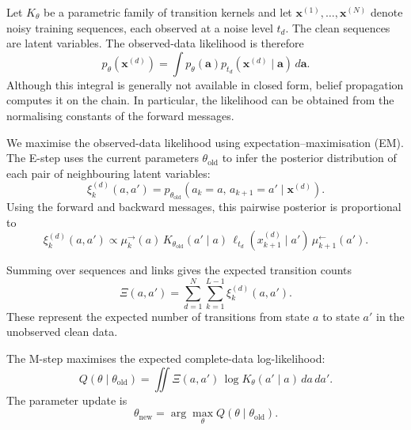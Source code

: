 Let $K_\theta$ be a parametric family of transition kernels
and let $\mathbf{x}^{(1)},\ldots,\mathbf{x}^{(N)}$ denote
noisy training sequences, each observed at a noise level
$t_d$. The clean sequences are latent variables. The
observed-data likelihood is therefore
\begin{equation}
    p_\theta(\mathbf{x}^{(d)})
    =
    \int
    p_\theta(\mathbf{a})
    p_{t_d}(\mathbf{x}^{(d)}\mid\mathbf{a})
    \,d\mathbf{a}.
\end{equation}
Although this integral is generally not available in
closed form, belief propagation computes it on the chain.
In particular, the likelihood can be obtained from the
normalising constants of the forward messages.

We maximise the observed-data likelihood using
expectation--maximisation (EM). The E-step uses the current
parameters $\theta_{\mathrm{old}}$ to infer the posterior
distribution of each pair of neighbouring latent variables:
\begin{equation}
    \xi_k^{(d)}(a,a')
    =
    p_{\theta_{\mathrm{old}}}
    \left(
        a_k=a,\,
        a_{k+1}=a'
        \mid \mathbf{x}^{(d)}
    \right).
\end{equation}
Using the forward and backward messages, this pairwise
posterior is proportional to
\begin{equation}
    \xi_k^{(d)}(a,a')
    \propto
    \mu_k^{\rightarrow}(a)\,
    K_{\theta_{\mathrm{old}}}(a'\mid a)\,
    \ell_{t_d}(x_{k+1}^{(d)}\mid a')\,
    \mu_{k+1}^{\leftarrow}(a').
    \label{eq:pairwise-posterior}
\end{equation}

Summing over sequences and links gives the expected
transition counts
\begin{equation}
    \Xi(a,a')
    =
    \sum_{d=1}^{N}
    \sum_{k=1}^{L-1}
    \xi_k^{(d)}(a,a').
\end{equation}
These represent the expected number of transitions from
state $a$ to state $a'$ in the unobserved clean data.

The M-step maximises the expected complete-data
log-likelihood:
\begin{equation}
    Q(\theta\mid\theta_{\mathrm{old}})
    =
    \iint
    \Xi(a,a')\,
    \log K_\theta(a'\mid a)
    \,da\,da'.
    \label{eq:em-objective}
\end{equation}
The parameter update is
\begin{equation}
    \theta_{\mathrm{new}}
    =
    \arg\max_\theta
    Q(\theta\mid\theta_{\mathrm{old}}).
\end{equation}

